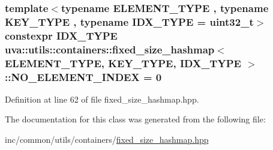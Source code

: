\subsubsection[{N\+O\+\_\+\+E\+L\+E\+M\+E\+N\+T\+\_\+\+I\+N\+D\+E\+X}]{\setlength{\rightskip}{0pt plus 5cm}template$<$typename E\+L\+E\+M\+E\+N\+T\+\_\+\+T\+Y\+P\+E , typename K\+E\+Y\+\_\+\+T\+Y\+P\+E , typename I\+D\+X\+\_\+\+T\+Y\+P\+E  = uint32\+\_\+t$>$ constexpr I\+D\+X\+\_\+\+T\+Y\+P\+E {\bf uva\+::utils\+::containers\+::fixed\+\_\+size\+\_\+hashmap}$<$ E\+L\+E\+M\+E\+N\+T\+\_\+\+T\+Y\+P\+E, K\+E\+Y\+\_\+\+T\+Y\+P\+E, I\+D\+X\+\_\+\+T\+Y\+P\+E $>$\+::N\+O\+\_\+\+E\+L\+E\+M\+E\+N\+T\+\_\+\+I\+N\+D\+E\+X = 0\hspace{0.3cm}{\ttfamily [static]}}\label{classuva_1_1utils_1_1containers_1_1fixed__size__hashmap_acd50115f076ea8726089a1cf8526527d}


Definition at line 62 of file fixed\+\_\+size\+\_\+hashmap.\+hpp.



The documentation for this class was generated from the following file\+:\begin{DoxyCompactItemize}
\item 
inc/common/utils/containers/\hyperlink{fixed__size__hashmap_8hpp}{fixed\+\_\+size\+\_\+hashmap.\+hpp}\end{DoxyCompactItemize}
